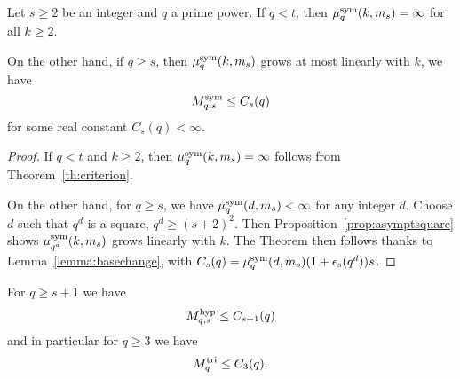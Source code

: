 \begin{thm}
Let $s\geq2$ be an integer and $q$ a prime power.
If $q<t$, then $\mu^{\textrm{sym}}_q(k,m_s)=\infty$ for all $k\geq2$.

On the other hand, if $q\geq s$,
then $\mu^{\textrm{sym}}_q(k,m_s)$ grows at most linearly with $k$, \ie we have
\[
M^{\textrm{sym}}_{q,s}\leq C_s(q)
\]
for some real constant $C_s(q)<\infty$.
\end{thm}
\begin{proof}
If $q<t$ and $k\geq2$, then $\mu^{\textrm{sym}}_q(k,m_s)=\infty$ follows from Theorem~\ref{th:criterion}.

On the other hand, for $q\geq s$, we have $\mu^{\textrm{sym}}_q(d,m_s)<\infty$ for any integer $d$.
Choose $d$ such that $q^d$ is a square, $q^d\geq(s+2)^2$.
Then Proposition~\ref{prop:asymptsquare} shows $\mu^{\textrm{sym}}_{q^d}(k,m_s)$ grows linearly with $k$.
The Theorem then follows thanks to Lemma~\ref{lemma:basechange}, with $C_s(q)=\mu^{\textrm{sym}}_q(d,m_s)(1+\epsilon_s(q^d))s$.
\end{proof}
\begin{cor}
For $q\geq s+1$ we have
\[
M^{\textrm{hyp}}_{q,s}\leq C_{s+1}(q)
\]
and in particular for $q\geq 3$ we have
\[
M^{\textrm{tri}}_q\leq C_{3}(q).
\]
\end{cor}

%
